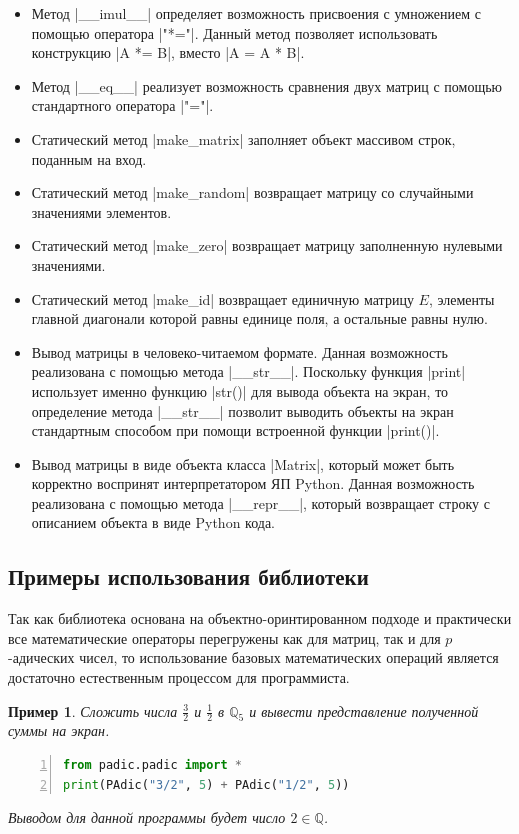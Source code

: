\documentclass[master, och, diploma, times]{sty/SCWorks}
\theoremstyle{plain}
\newtheorem{exmp}{Пример}[section]
\theoremstyle{definition}
\numberwithin{equation}{section}
\begin{document}
\begin{itemize}
\item Метод |__imul__| определяет возможность присвоения с умножением с помощью оператора |"*="|. Данный метод позволяет использовать конструкцию |A *= B|, вместо |A = A * B|.
\item Метод |__eq__| реализует возможность сравнения двух матриц с помощью стандартного оператора |"="|.
\item Статический метод |make_matrix| заполняет объект массивом строк, поданным на вход.
\item Статический метод |make_random| возвращает матрицу со случайными значениями элементов.
\item Статический метод |make_zero| возвращает матрицу заполненную нулевыми значениями.
\item Статический метод |make_id| возвращает единичную матрицу $E$, элементы главной диагонали которой равны единице поля, а остальные равны нулю.
\item Вывод матрицы в человеко-читаемом формате. Данная возможность реализована с помощью метода |__str__|. Поскольку функция |print| использует именно функцию |str()| для вывода объекта на экран, то определение метода |__str__| позволит выводить объекты на экран стандартным способом при помощи встроенной функции |print()|.
\item Вывод матрицы в виде объекта класса |Matrix|, который может быть корректно воспринят интерпретатором ЯП Python. Данная возможность реализована с помощью метода |__repr__|, который возвращает строку с описанием объекта в виде Python кода.
\end{itemize}


\subsection{Примеры использования библиотеки}

Так как библиотека основана на объектно-оринтированном подходе и практически все математические операторы перегружены как для матриц, так и для $p$-адических чисел, то использование базовых математических операций является достаточно естественным процессом для программиста.

\begin{exmp}
Сложить числа $\frac{3}{2}$ и $\frac{1}{2}$ в $\mathbb{Q}_5$ и вывести представление полученной суммы на экран.
\begin{lstlisting}[language=Python, numbers=left, showstringspaces=false, breaklines=true, basicstyle=\small]
from padic.padic import *
print(PAdic("3/2", 5) + PAdic("1/2", 5))
\end{lstlisting}

\noindent Выводом для данной программы будет число $2 \in \mathbb{Q}$.
\end{exmp}
\end{document}
